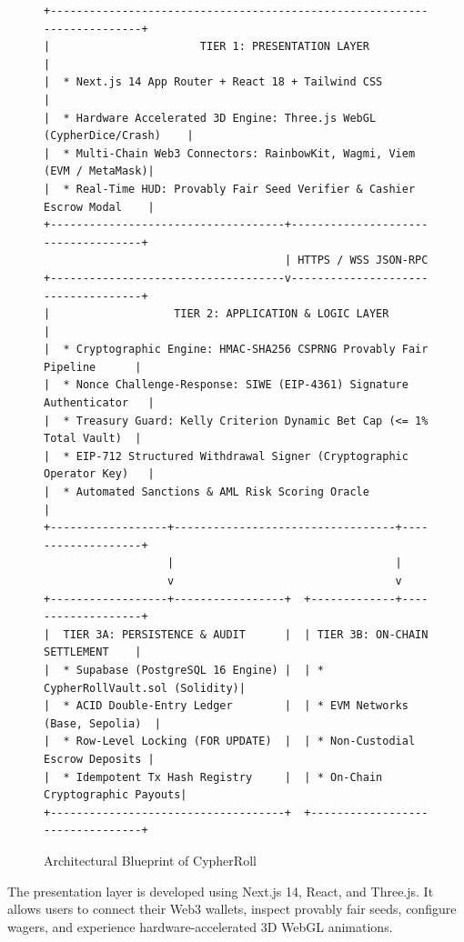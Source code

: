 \begin{figure}[h!]
\centering
\begin{tcolorbox}[colback=gray!5,colframe=blue!70!black,left=2mm,right=2mm,top=2mm,bottom=2mm,title=\textbf{Figure 6.1: CypherRoll 3-Tier Architecture High-Level Design}]
\scriptsize
\begin{verbatim}
+-------------------------------------------------------------------------+
|                       TIER 1: PRESENTATION LAYER                        |
|  * Next.js 14 App Router + React 18 + Tailwind CSS                      |
|  * Hardware Accelerated 3D Engine: Three.js WebGL (CypherDice/Crash)    |
|  * Multi-Chain Web3 Connectors: RainbowKit, Wagmi, Viem (EVM / MetaMask)|
|  * Real-Time HUD: Provably Fair Seed Verifier & Cashier Escrow Modal    |
+------------------------------------+------------------------------------+
                                     | HTTPS / WSS JSON-RPC
+------------------------------------v------------------------------------+
|                   TIER 2: APPLICATION & LOGIC LAYER                     |
|  * Cryptographic Engine: HMAC-SHA256 CSPRNG Provably Fair Pipeline      |
|  * Nonce Challenge-Response: SIWE (EIP-4361) Signature Authenticator   |
|  * Treasury Guard: Kelly Criterion Dynamic Bet Cap (<= 1% Total Vault)  |
|  * EIP-712 Structured Withdrawal Signer (Cryptographic Operator Key)   |
|  * Automated Sanctions & AML Risk Scoring Oracle                        |
+------------------+----------------------------------+-------------------+
                   |                                  |
                   v                                  v
+------------------+-----------------+  +-------------+-------------------+
|  TIER 3A: PERSISTENCE & AUDIT      |  | TIER 3B: ON-CHAIN SETTLEMENT    |
|  * Supabase (PostgreSQL 16 Engine) |  | * CypherRollVault.sol (Solidity)|
|  * ACID Double-Entry Ledger        |  | * EVM Networks (Base, Sepolia)  |
|  * Row-Level Locking (FOR UPDATE)  |  | * Non-Custodial Escrow Deposits |
|  * Idempotent Tx Hash Registry     |  | * On-Chain Cryptographic Payouts|
+------------------------------------+  +---------------------------------+
\end{verbatim}
\end{tcolorbox}
\caption{Architectural Blueprint of CypherRoll}
\end{figure}

The presentation layer is developed using Next.js 14, React, and Three.js. It allows users to connect their Web3 wallets, inspect provably fair seeds, configure wagers, and experience hardware-accelerated 3D WebGL animations.

